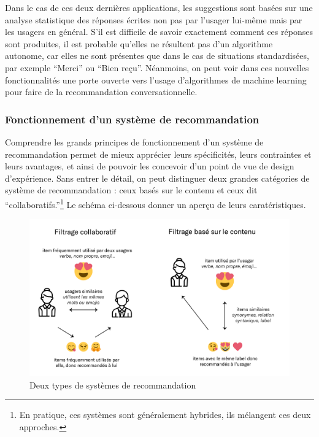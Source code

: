 \documentclass[]{article}
\begin{document}
Dans le cas de ces deux dernières applications, les suggestions sont
basées sur une analyse statistique des réponses écrites non pas par
l'usager lui-même mais par les usagers en général. S'il est difficile de
savoir exactement comment ces réponses sont produites, il est probable
qu'elles ne résultent pas d'un algorithme autonome, car elles ne sont
présentes que dans le cas de situations standardisées, par exemple
``Merci'' ou ``Bien reçu''. Néanmoins, on peut voir dans ces nouvelles
fonctionnalités une porte ouverte vers l'usage d'algorithmes de machine
learning pour faire de la recommandation conversationnelle.

\hypertarget{fonctionnement-dun-systuxe8me-de-recommandation}{%
\subsubsection{Fonctionnement d'un système de
recommandation}\label{fonctionnement-dun-systuxe8me-de-recommandation}}

Comprendre les grands principes de fonctionnement d'un système de
recommandation permet de mieux apprécier leurs spécificités, leurs
contraintes et leurs avantages, et ainsi de pouvoir les concevoir d'un
point de vue de design d'expérience. Sans entrer le détail, on peut
distinguer deux grandes catégories de système de recommandation : ceux
basés sur le contenu et ceux dit ``collaboratifs.''\footnote{En
  pratique, ces systèmes sont généralement hybrides, ils mélangent ces
  deux approches.} Le schéma ci-dessous donner un aperçu de leurs
caratéristiques.

\begin{figure}
\centering
\includegraphics{./tex2pdf.9048/734eb3977aec2f5d5847ce3bde5b018c6fe2c10c.png}
\caption{Deux types de systèmes de recommandation}
\end{figure}
\end{document}
